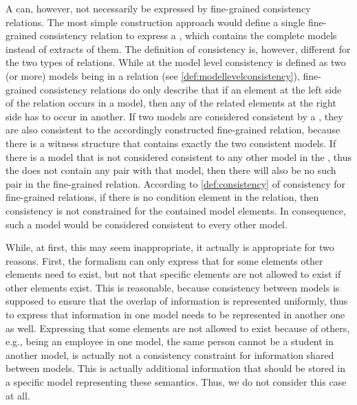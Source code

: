 A \modellevelconsistencyrelation can, however, not necessarily be expressed by fine-grained consistency relations.
The most simple construction approach would define a single fine-grained consistency relation to express a \modellevelconsistencyrelation, which contains the complete models instead of extracts of them.
The definition of consistency is, however, different for the two types of relations.
While at the model level consistency is defined as two (or more) models being in a relation (see \autoref{def:modellevelconsistency}), fine-grained consistency relations do only describe that if an element at the left side of the relation occurs in a model, then any of the related elements at the right side has to occur in another.
If two models are considered consistent by a \modellevelconsistencyrelation, they are also consistent to the accordingly constructed fine-grained relation, because there is a witness structure that contains exactly the two consistent models.
If there is a model that is not considered consistent to any other model in the \modellevelconsistencyrelation, thus the \modellevelconsistencyrelation does not contain any pair with that model, then there will also be no such pair in the fine-grained relation.
According to \autoref{def:consistency} of consistency for fine-grained relations, if there is no condition element in the relation, then consistency is not constrained for the contained model elements.
In consequence, such a model would be considered consistent to every other model.

While, at first, this may seem inappropriate, it actually is appropriate for two reasons.
First, the formalism can only express that for some elements other elements need to exist, but not that specific elements are not allowed to exist if other elements exist.
This is reasonable, because consistency between models is supposed to ensure that the overlap of information is represented uniformly, thus to express that information in one model needs to be represented in another one as well.
Expressing that some elements are not allowed to exist because of others, e.g., being an employee in one model, the same person cannot be a student in another model, is actually not a consistency constraint for information shared between models.
This is actually additional information that should be stored in a specific model representing these semantics.
Thus, we do not consider this case at all.

